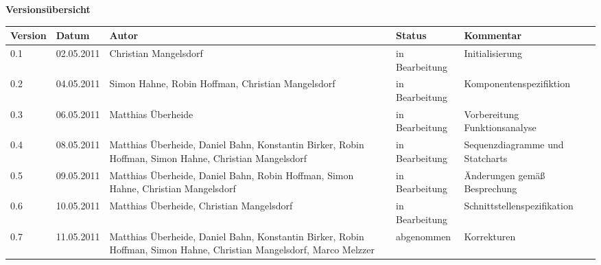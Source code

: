 

{\textbf{Versionsübersicht}}\\[2ex]

\begin{longtable}{|m{1.78cm}|m{1.59cm}|m{2.86cm}|m{1.9cm}|m{5.25cm}|}

  \hline                                              %

  \textbf{Version}  &    \textbf{Datum}  &    \textbf{Autor}  &
  \textbf{Status}   &    \textbf{Kommentar}       \\  %
  \hline                                              %

  0.1&02.05.2011&Christian Mangelsdorf&in Bearbeitung&Initialisierung\\
  \hline
  0.2&04.05.2011&Simon Hahne, Robin Hoffman, Christian Mangelsdorf&in Bearbeitung&Komponentenspezifiktion\\
  \hline
  0.3&06.05.2011&Matthias Überheide&in Bearbeitung&Vorbereitung Funktionsanalyse\\
  \hline
  0.4&08.05.2011&Matthias Überheide, Daniel Bahn, Konstantin Birker, Robin Hoffman, Simon Hahne, Christian Mangelsdorf&in Bearbeitung&Sequenzdiagramme und Statcharts\\
  \hline
  0.5&09.05.2011&Matthias Überheide, Daniel Bahn, Robin Hoffman, Simon Hahne, Christian Mangelsdorf&in Bearbeitung&Änderungen gemäß Besprechung\\
  \hline
  0.6&10.05.2011&Matthias Überheide, Christian Mangelsdorf&in Bearbeitung&Schnittstellenspezifikation\\
  \hline
  0.7&11.05.2011&Matthias Überheide, Daniel Bahn, Konstantin Birker, Robin Hoffman, Simon Hahne, Christian Mangelsdorf, Marco Melzzer&abgenommen&Korrekturen\\
  \hline

\end{longtable}

